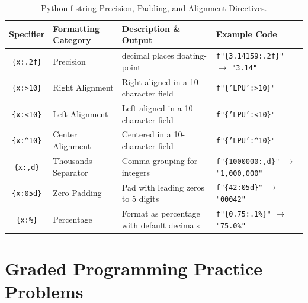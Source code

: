 \begin{table}[htbp]
\centering
\small
\renewcommand{\arraystretch}{1.2}
\begin{tabularx}{\linewidth}{cl>{\raggedright\arraybackslash}Xl}
\toprule
\textbf{Specifier} & \textbf{Formatting Category} & \textbf{Description \& Output} & \textbf{Example Code} \\
\midrule
\texttt{\{x:.2f\}} & Precision & 2 decimal places floating-point & \texttt{f"\{3.14159:.2f\}"} $\to$ \texttt{"3.14"} \\
\texttt{\{x:>10\}} & Right Alignment & Right-aligned in a 10-character field & \texttt{f"\{'LPU':>10\}"} \\
\texttt{\{x:<10\}} & Left Alignment & Left-aligned in a 10-character field & \texttt{f"\{'LPU':<10\}"} \\
\texttt{\{x:\textasciicircum 10\}} & Center Alignment & Centered in a 10-character field & \texttt{f"\{'LPU':\textasciicircum 10\}"} \\
\texttt{\{x:,d\}} & Thousands Separator & Comma grouping for integers & \texttt{f"\{1000000:,d\}"} $\to$ \texttt{"1,000,000"} \\
\texttt{\{x:05d\}} & Zero Padding & Pad with leading zeros to 5 digits & \texttt{f"\{42:05d\}"} $\to$ \texttt{"00042"} \\
\texttt{\{x:\%\}} & Percentage & Format as percentage with default decimals & \texttt{f"\{0.75:.1\%\}"} $\to$ \texttt{"75.0\%"} \\
\bottomrule
\end{tabularx}
\caption{Python f-string Precision, Padding, and Alignment Directives.}
\label{tab:master-fstrings}
\end{table}


\section{Graded Programming Practice Problems}

